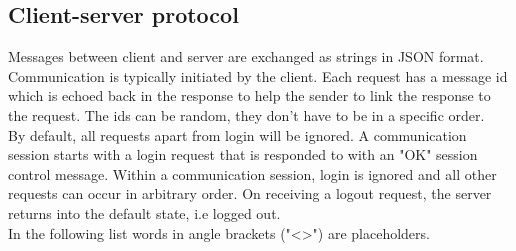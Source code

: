 \documentclass[oneside, english, final]{design}
\begin{document}
\clearpage


\subsection{Client-server protocol}

Messages between client and server are exchanged as strings in JSON format.
Communication is typically initiated by the client. Each request has a message id which is echoed back in the response to help the sender to link the response to the request. The ids can be random, they don't have to be in a specific order.
\\
By default, all requests apart from login will be ignored.  A communication session starts with a login request that is responded to with an "OK" session control message. Within a communication session, login is ignored and all other requests can occur in arbitrary order. On receiving a logout request, the server returns into the default state, i.e logged out.
\\
In the following list words in angle brackets ("<>") are placeholders.
\\
\end{document}
